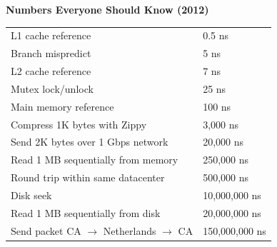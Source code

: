 \documentclass{article}
\begin{document}
    \textbf{Numbers Everyone Should Know (2012)}
    \begin{table}[H]
    \begin{tabular}{ll}
        L1 cache reference & 0.5 ns  \\
        Branch mispredict &  5 ns \\
        L2 cache reference & 7 ns \\
        Mutex lock/unlock & 25 ns \\
        Main memory reference & 100 ns \\
        Compress 1K bytes with Zippy & 3,000 ns \\
        Send 2K bytes over 1 Gbps network & 20,000 ns \\
        Read 1 MB sequentially from memory & 250,000 ns \\
        Round trip within same datacenter & 500,000 ns \\
        Disk seek & 10,000,000 ns \\
        Read 1 MB sequentially from disk & 20,000,000 ns \\
        Send packet CA $\to$ Netherlands $\to$ CA & 150,000,000 ns 
    \end{tabular}
    \end{table}
    
\end{document}
